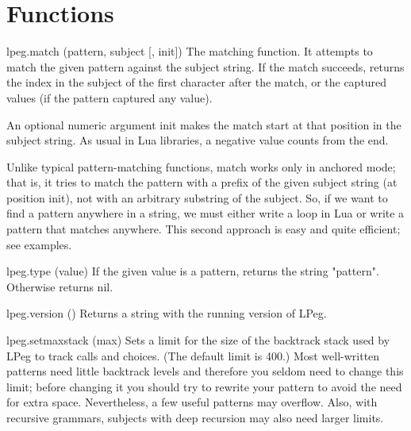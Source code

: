 \section{Functions}

\begin{docLpeg}{lpeg.match (pattern, subject [, init])}
The matching function. It attempts to match the given pattern against the subject string. If the match succeeds, returns the index in the subject of the first character after the match, or the captured values (if the pattern captured any value).
\end{docLpeg}

An optional numeric argument init makes the match start at that position in the subject string. As usual in Lua libraries, a negative value counts from the end.

Unlike typical pattern-matching functions, match works only in anchored mode; that is, it tries to match the pattern with a prefix of the given subject string (at position init), not with an arbitrary substring of the subject. So, if we want to find a pattern anywhere in a string, we must either write a loop in Lua or write a pattern that matches anywhere. This second approach is easy and quite efficient; see examples.


\begin{docLpeg}{lpeg.type (value)}
If the given value is a pattern, returns the string "pattern". Otherwise returns nil.
\end{docLpeg}

\begin{docLpeg}{lpeg.version ()}
Returns a string with the running version of LPeg.
\end{docLpeg}

\begin{docLpeg}{lpeg.setmaxstack (max)}
Sets a limit for the size of the backtrack stack used by LPeg to track calls and choices. (The default limit is 400.) Most well-written patterns need little backtrack levels and therefore you seldom need to change this limit; before changing it you should try to rewrite your pattern to avoid the need for extra space. Nevertheless, a few useful patterns may overflow. Also, with recursive grammars, subjects with deep recursion may also need larger limits.
\end{docLpeg}


